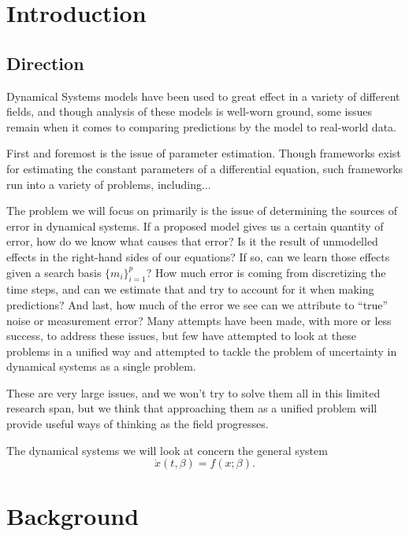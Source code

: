 \documentclass[12pt]{article}
\begin{document}
\section{Introduction}

\subsection{Direction}

Dynamical Systems models have been used to great effect in a variety of different fields, and though analysis of these models is well-worn ground, some issues remain when it comes to comparing predictions by the model to real-world data.


First and foremost is the issue of parameter estimation. Though frameworks exist for estimating the constant parameters of a differential equation, such frameworks run into a variety of problems, including$\ldots$


The problem we will focus on primarily is the issue of determining the sources of error in dynamical systems. If a proposed model gives us a certain quantity of error, how do we know what causes that error? Is it the result of unmodelled effects in the right-hand sides of our equations? If so, can we learn those effects given a search basis $\{ m_i\}_{i=1}^p$? How much error is coming from discretizing the time steps, and can we estimate that and try to account for it when making predictions? And last, how much of the error we see can we attribute to ``true'' noise or measurement error? Many attempts have been made, with more or less success, to address these issues, but few have attempted to look at these problems in a unified way and attempted to tackle the problem of uncertainty in dynamical systems as a single problem.


These are very large issues, and we won't try to solve them all in this limited research span, but we think that approaching them as a unified problem will provide useful ways of thinking as the field progresses.


The dynamical systems we will look at concern the general system $$\dot{x}(t,\beta) = f(x;\beta).$$



\section{Background}
\end{document}
